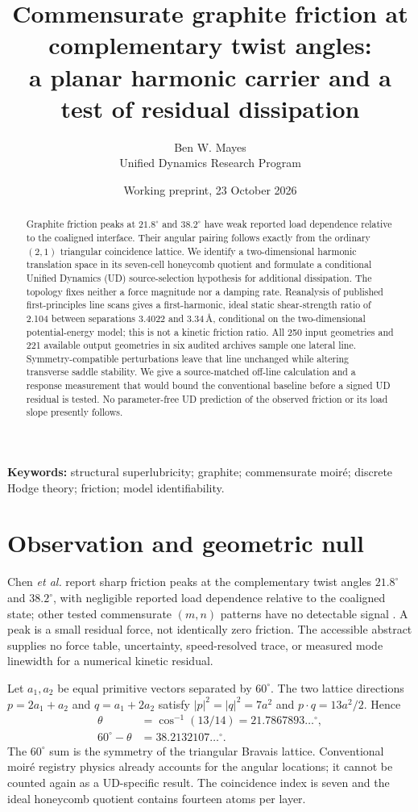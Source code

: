 \documentclass[9pt,a4paper,twocolumn]{extarticle}
\title{Commensurate graphite friction at complementary twist angles:\\a planar harmonic carrier and a test of residual dissipation}
\author{Ben W. Mayes\\\small Unified Dynamics Research Program}
\date{Working preprint, 23 October 2026}
\begin{document}
\maketitle
\begin{abstract}
Graphite friction peaks at $21.8^\circ$ and $38.2^\circ$ have weak reported load dependence relative to the coaligned interface. Their angular pairing follows exactly from the ordinary $(2,1)$ triangular coincidence lattice. We identify a two-dimensional harmonic translation space in its seven-cell honeycomb quotient and formulate a conditional Unified Dynamics (UD) source-selection hypothesis for additional dissipation. The topology fixes neither a force magnitude nor a damping rate. Reanalysis of published first-principles line scans gives a first-harmonic, ideal static shear-strength ratio of 2.104 between separations 3.4022 and 3.34\,\AA, conditional on the two-dimensional potential-energy model; this is not a kinetic friction ratio. All 250 input geometries and 221 available output geometries in six audited archives sample one lateral line. Symmetry-compatible perturbations leave that line unchanged while altering transverse saddle stability. We give a source-matched off-line calculation and a response measurement that would bound the conventional baseline before a signed UD residual is tested. No parameter-free UD prediction of the observed friction or its load slope presently follows.
\end{abstract}
\noindent\textbf{Keywords:} structural superlubricity; graphite; commensurate moir\'e; discrete Hodge theory; friction; model identifiability.

\section{Observation and geometric null}
Chen \emph{et al.} report sharp friction peaks at the complementary twist angles $21.8^\circ$ and $38.2^\circ$, with negligible reported load dependence relative to the coaligned state; other tested commensurate $(m,n)$ patterns have no detectable signal \cite{chen}. A peak is a small residual force, not identically zero friction. The accessible abstract supplies no force table, uncertainty, speed-resolved trace, or measured mode linewidth for a numerical kinetic residual.

Let $a_1,a_2$ be equal primitive vectors separated by $60^\circ$. The two lattice directions $p=2a_1+a_2$ and $q=a_1+2a_2$ satisfy $|p|^2=|q|^2=7a^2$ and $p\cdot q=13a^2/2$. Hence
\begin{equation}
 \begin{aligned}
 \theta &= \cos^{-1}(13/14)=21.7867893\ldots^\circ,\\
 60^\circ-\theta &=38.2132107\ldots^\circ.
 \end{aligned} \label{eq:angle}
\end{equation}
The $60^\circ$ sum is the symmetry of the triangular Bravais lattice. Conventional moir\'e registry physics already accounts for the angular locations; it cannot be counted again as a UD-specific result. The coincidence index is seven and the ideal honeycomb quotient contains fourteen atoms per layer.
\end{document}
